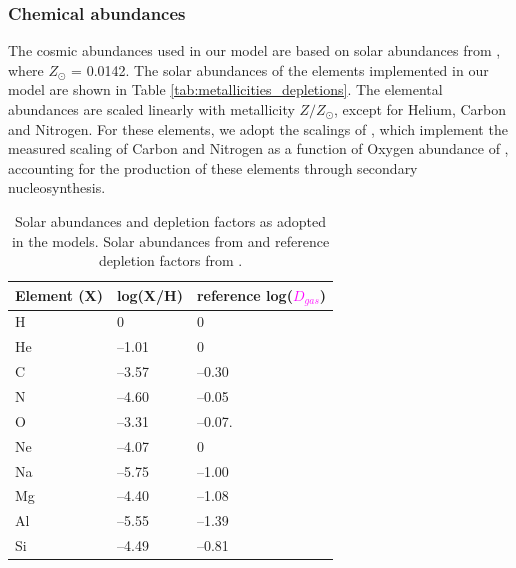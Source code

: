 \documentclass[fleqn,usenatbib]{mnras}
\begin{document}
\subsubsection{Chemical abundances}
The cosmic abundances used in our model are based on solar abundances from \cite{grevesse2010}, where $Z_{\odot}$ = 0.0142. The solar abundances of the elements implemented in our model are shown in Table \ref{tab:metallicities_depletions}. The elemental abundances are scaled linearly with metallicity $Z/Z_{\odot}$, except for Helium, Carbon and Nitrogen. For these elements, we adopt the scalings of \cite{dopita2013}, which implement the measured scaling of Carbon and Nitrogen as a function of Oxygen abundance of \cite{vanzee1998}, accounting for the production of these elements through secondary nucleosynthesis.

\begin{table}
 \centering
 \caption{Solar abundances and depletion factors as adopted in the models. Solar abundances from \protect \cite{grevesse2010} and reference depletion factors from \protect \cite{dopita2013}.}
 \begin{tabularx}{\columnwidth}{p{} p{} p{} }
\hline
\hline 
\textbf{Element (X)} & \textbf{log(X/H)} & \textbf{reference log(\textcolor{magenta}{$D_{gas}$})}             \\ \hline
H                    & 0                 & 0                                       \\
He                   & --1.01            & 0                                       \\
C                    & --3.57            & --0.30                                  \\
N                    & --4.60            & --0.05                                  \\
O                    & --3.31            & --0.07.                                 \\
Ne                   & --4.07            & 0                                       \\
Na                   & --5.75            & --1.00                                  \\
Mg                   & --4.40            & --1.08                                  \\
Al                   & --5.55            & --1.39                                  \\
Si                   & --4.49            & --0.81                                  \\

\end{tabularx}
\end{table}
\end{document}
